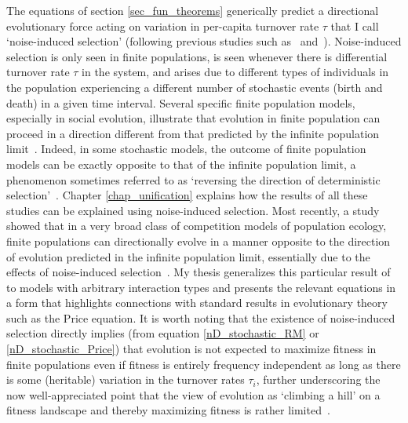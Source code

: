 The equations of section \ref{sec_fun_theorems} generically predict a directional evolutionary force acting on variation in per-capita turnover rate $\tau$ that I call `noise-induced selection' (following previous studies such as~\cite{constable_demographic_2016} and~\cite{week_white_2021}). Noise-induced selection is only seen in finite populations, is seen whenever there is differential turnover rate $\tau$ in the system, and arises due to different types of individuals in the population experiencing a different number of stochastic events (birth and death) in a given time interval. Several specific finite population models, especially in social evolution, illustrate that evolution in finite population can proceed in a direction different from that predicted by the infinite population limit~\citep{parsons_consequences_2010,melbinger_evolutionary_2010, houchmandzadeh_selection_2012, houchmandzadeh_fluctuation_2015,chotibut_evolutionary_2015,debarre_evolutionary_2016, behar_fluctuations-induced_2016, constable_demographic_2016,abu_awad_effects_2018,parsons_pathogen_2018,mcavoy_public_2018,mcleod_social_2019}. Indeed, in some stochastic models, the outcome of finite population models can be exactly opposite to that of the infinite population limit, a phenomenon sometimes referred to as `reversing the direction of deterministic selection'~\citep{constable_demographic_2016,mcleod_social_2019}. Chapter \ref{chap_unification} explains how the  results of all these studies can be explained using noise-induced selection. Most recently, a study showed that in a very broad class of competition models of population ecology, finite populations can directionally evolve in a manner opposite to the direction of evolution predicted in the infinite population limit, essentially due to the effects of noise-induced selection~\citep{mazzolini_universality_2022}. My thesis generalizes this particular result of~\cite{mazzolini_universality_2022} to models with arbitrary interaction types and presents the relevant equations in a form that highlights connections with standard results in evolutionary theory such as the Price equation. It is worth noting that the existence of noise-induced selection directly implies (from equation \eqref{nD_stochastic_RM} or \eqref{nD_stochastic_Price}) that evolution is not expected to maximize fitness in finite populations even if fitness is entirely frequency independent as long as there is some (heritable) variation in the turnover rates $\tau_i$, further underscoring the now well-appreciated point that the view of evolution as `climbing a hill' on a fitness landscape and thereby maximizing fitness is rather limited~\citep{grodwohl_theory_2017}.

